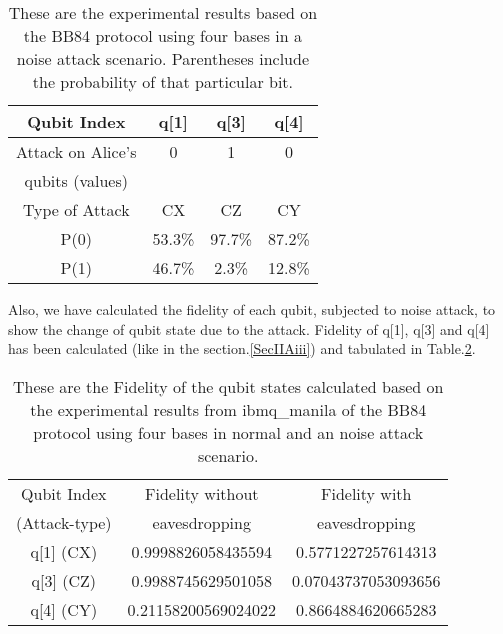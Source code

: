 \documentclass[superscriptaddress,twocolumn,showpacs,prb,floatfix]{revtex4}
\begin{document}
\begin{table}[ht]
    \centering
    \begin{tabular}{|c|c|c|c|}
    \hline
    \hline
    Qubit Index & q[1] & q[3] & q[4] \\[0.5ex]
    \hline
    Attack on Alice's & 0 & 1 & 0  \\ qubits (values) & & &  \\[0.5ex]
    \hline
    Type of Attack & CX & CZ & CY \\[0.5ex]
    \hline
    P(0) & 53.3\% & 97.7\% & 87.2\% \\[0.5ex]
    \hline
    P(1) & 46.7\% & 2.3\% & 12.8\% \\[0.5ex]
    \hline
    \end{tabular}
    \caption{These are the experimental results based on the BB84 protocol using four bases in a noise attack scenario. Parentheses include the probability of that particular bit.}
    \label{qkdtable7}
\end{table}
Also, we have calculated the fidelity of each qubit, subjected to noise attack, to show the change of qubit state due to the attack. Fidelity of q[1], q[3] and q[4] has been calculated (like in the section.\ref{SecIIAiii}) and tabulated in Table.\ref{Fid_table_nois}.
\begin{table}[ht]
    \centering
    \begin{tabular}{|c|c|c|}
    \hline
    \hline
    Qubit Index & Fidelity without & Fidelity with \\(Attack-type) & eavesdropping & eavesdropping \\ [0.5ex]
    \hline
     q[1] (CX) & 0.9998826058435594 & 0.5771227257614313 \\ [0.5ex]
    \hline
     q[3] (CZ)& 0.9988745629501058  &  0.07043737053093656\\ [0.5ex]
    \hline
    q[4] (CY)& 0.21158200569024022 & 0.8664884620665283 \\[0.5ex]
    \hline
    \end{tabular}
    \caption{These are the Fidelity of the qubit states calculated based on the experimental results from ibmq\_manila of the BB84 protocol using four bases in normal and an noise attack scenario.}
    \label{Fid_table_nois}
\end{table}
\end{document}

